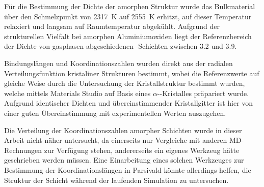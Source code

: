 Für die Bestimmung der Dichte der amorphen Struktur wurde das Bulkmaterial über den Schmelzpunkt von \SI{2317}{\kelvin} auf \SI{2555}{\kelvin} erhitzt, auf dieser Temperatur relaxiert und langsam auf Raumtemperatur abgekühlt.
Aufgrund der strukturellen Vielfalt bei amorphen Aluminiumoxiden liegt der Referenzbereich der Dichte von gasphasen-abgeschiedenen -Schichten zwischen \SI{3.2}{\gpcc} und \SI{3.9}{\gpcc}\cite{wang_dependence_1997}.

Bindungslängen und Koordinationszahlen wurden direkt aus der radialen Verteilungsfunktion kristaliner Strukturen bestimmt, wobei die Referenzwerte auf gleiche Weise durch die Untersuchung der Kristallstruktur bestimmt wurden, welche mittels Materials Studio\cite{biovia_materials_2014} auf Basis eines $\alpha$--Kristalles präpariert wurde.
Aufgrund identischer Dichten und übereinstimmender Kristallgitter ist hier von einer guten Übereinstimmung mit experimentellen Werten auszugehen.

Die Verteilung der Koordinationszahlen amorpher Schichten wurde in dieser Arbeit nicht näher untersucht, da einerseits nur Vergleiche mit anderen MD-Rechnungen zur Verfügung stehen\cite{gutierrez_molecular_2002}, andererseits ein eigenes Werkzeug hätte geschrieben werden müssen.
Eine Einarbeitung eines solchen Werkzeuges zur Bestimmung der Koordinationslängen in Parsivald könnte allerdings helfen, die Struktur der Schicht während der laufenden Simulation zu untersuchen.

